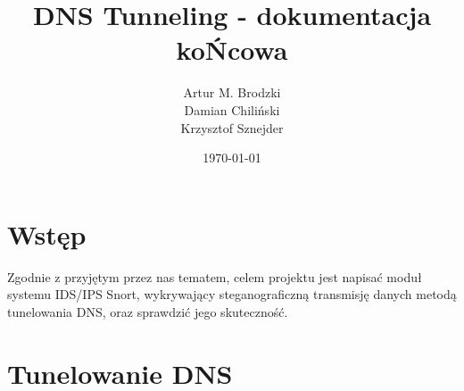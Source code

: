 \documentclass{eiti-raport}
\begin{document}
\author{Artur M. Brodzki \\ Damian Chiliński \\ Krzysztof Sznejder}
\date{\today}
\subject{BCYB 19L}
\title{DNS Tunneling - dokumentacja koŃcowa}

\maketitle


\section{Wstęp} \label{sec:intro}
Zgodnie z przyjętym przez nas tematem, celem projektu jest napisać moduł systemu IDS/IPS Snort, wykrywający steganograficzną transmisję danych metodą tunelowania DNS, oraz sprawdzić jego skuteczność. 

\section{Tunelowanie DNS} \label{sec:2}
\end{document}
